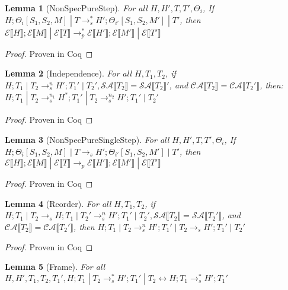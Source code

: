 \documentclass[9pt]{article}
\newtheorem{lemma}{Lemma}
\newcommand\specStep{\rightarrow_{s}}
\newcommand\parStep{\rightarrow_{p}}
\newcommand{\erase}[1]{\mathcal{E}\llbracket #1 \rrbracket}
\newcommand{\specActions}[1]{\mathcal{SA} \llbracket #1 \rrbracket}
\newcommand{\commitActions}[1]{\mathcal{CA} \llbracket #1 \rrbracket}
\begin{document}
\begin{lemma}[NonSpecPureStep]
\label{nonSpecPureStep}
For all $H, H', T, T', \Theta_i$, If $H; \Theta_i[S_1, S_2, M] \; | \; T \specStep^* H'; \Theta_{i'}[S_1, S_2, M']\; | \; T'$, then $\erase{H}; \erase{M} \; | \; \erase{T} \parStep^* \erase{H'}; \erase{M'} \; | \; \erase{T'}$
\end{lemma}

\begin{proof}
Proven in Coq
\end{proof}

\begin{lemma}[Independence]
\label{independence}
For all $H, T_1, T_2$, if $H; T_1 \; | \; T_2 \specStep^n H'; T_1' \; | \; T_2', \specActions{T_2} = \specActions{T_2}'$,  and $\commitActions{T_2} = \commitActions{T_2'}$, then: $H; T_1 \; | \; T_2 \specStep^{n_1} H^*; T_1' \; | \; T_2 \specStep^{n_2} H'; T_1' \; | \; T_2'$
\end{lemma}

\begin{proof}
Proven in Coq
\end{proof}

\begin{lemma}[NonSpecPureSingleStep]
\label{nonSpecPureSingleStep}
For all $H, H', T, T', \Theta_i$, If $H; \Theta_i[S_1, S_2, M] \; | \; T \specStep H'; \Theta_{i'}[S_1, S_2, M']\; | \; T'$, then $\erase{H}; \erase{M} \; | \; \erase{T} \parStep \erase{H'}; \erase{M'} \; | \; \erase{T'}$
\end{lemma}

\begin{proof}
Proven in Coq
\end{proof}

\begin{lemma}[Reorder]
\label{reorderLemma}
For all $H, T_1, T_2$, if $H; T_1 \; | \; T_2 \specStep H; T_1 \; | \; T_2' \specStep^n H'; T_1' \; | \; T_2', \specActions{T_2} = \specActions{T_2'}$, and $\commitActions{T_2} = \commitActions{T_2'}$, then $H; T_1 \; | \; T_2 \specStep^n H'; T_1' \; | \; T_2 \specStep H'; T_1' \; | \; T_2'$

\end{lemma}

\begin{proof}
Proven in Coq
\end{proof}

\begin{lemma}[Frame]
\label{frame}
For all $H, H', T_1, T_2, T_1', H; T_1 \; | \; T_2 \specStep^* H'; T_1' \; | \; T_2 \leftrightarrow H; T_1 \specStep^* H'; T_1'$
\end{lemma}
\end{document}
